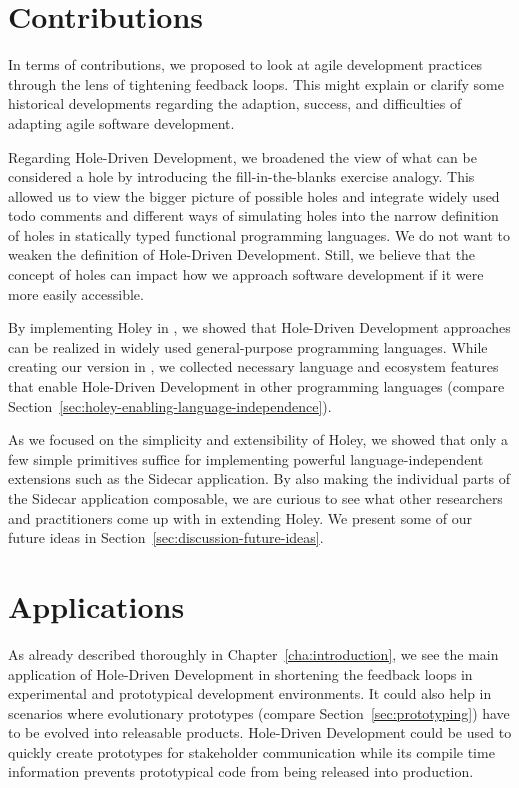 \section{Contributions}
\label{sec:discussion-contributions}
In terms of contributions, we proposed to look at agile development practices through the lens of tightening feedback loops.
This might explain or clarify some historical developments regarding the adaption, success, and difficulties of adapting agile software development.

Regarding Hole-Driven Development, we broadened the view of what can be considered a hole by introducing the fill-in-the-blanks exercise analogy.
This allowed us to view the bigger picture of possible holes and integrate widely used todo comments and different ways of simulating holes into the narrow definition of holes in statically typed functional programming languages.
We do not want to weaken the definition of Hole-Driven Development.
Still, we believe that the concept of holes can impact how we approach software development if it were more easily accessible.

By implementing Holey in \CS, we showed that Hole-Driven Development approaches can be realized in widely used general-purpose programming languages.
While creating our version in \CS, we collected necessary language and ecosystem features that enable Hole-Driven Development in other programming languages (compare Section~\ref{sec:holey-enabling-language-independence}).

As we focused on the simplicity and extensibility of Holey, we showed that only a few simple primitives suffice for implementing powerful language-independent extensions such as the Sidecar application.
By also making the individual parts of the Sidecar application composable, we are curious to see what other researchers and practitioners come up with in extending Holey.
We present some of our future ideas in Section~\ref{sec:discussion-future-ideas}.


\section{Applications}
\label{sec:discussion-applications}
As already described thoroughly in Chapter~\ref{cha:introduction}, we see the main application of Hole-Driven Development in shortening the feedback loops in experimental and prototypical development environments.
It could also help in scenarios where evolutionary prototypes (compare Section~\ref{sec:prototyping}) have to be evolved into releasable products.
Hole-Driven Development could be used to quickly create prototypes for stakeholder communication while its compile time information prevents prototypical code from being released into production.

